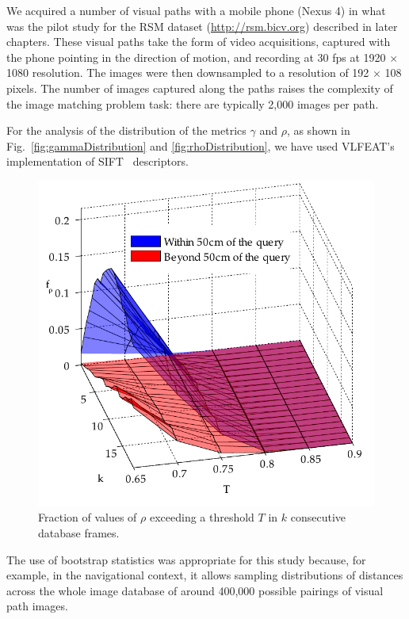 We acquired a number of visual paths with a mobile phone (Nexus 4) in what was the pilot study for the RSM dataset (\url{http://rsm.bicv.org}) described in later chapters.  These visual paths take the form of video acquisitions, captured with the phone pointing in the direction of motion, and recording at 30 fps at 1920 $\times$ 1080 resolution. The images were then downsampled to a resolution of 192 $\times$ 108 pixels. The number of images captured along the paths raises the complexity of the image matching problem task: there are typically 2,000 images per path.

For the analysis of the distribution of the metrics $\gamma$ and $\rho$, as shown in Fig.~\ref{fig:gammaDistribution} and \ref{fig:rhoDistribution}, we have used VLFEAT's~\cite{Vedaldi2008} implementation of SIFT~\cite{Lowe2004} descriptors.

\begin{figure}
\begin{center}
\includegraphics[width=.8\linewidth]{./gfx/Chapter02/C1twoTestWithBootstrapping2.pdf}
\caption{Fraction of values of $\rho$ exceeding a threshold $T$ in $k$ consecutive database frames.}
\label{fig:rocTwoParametersC5}
\end{center}
\end{figure}

The use of bootstrap statistics was appropriate for this study because, for example, in the navigational context, it allows sampling distributions of distances across the whole image database of around 400,000 possible pairings of visual path images.

